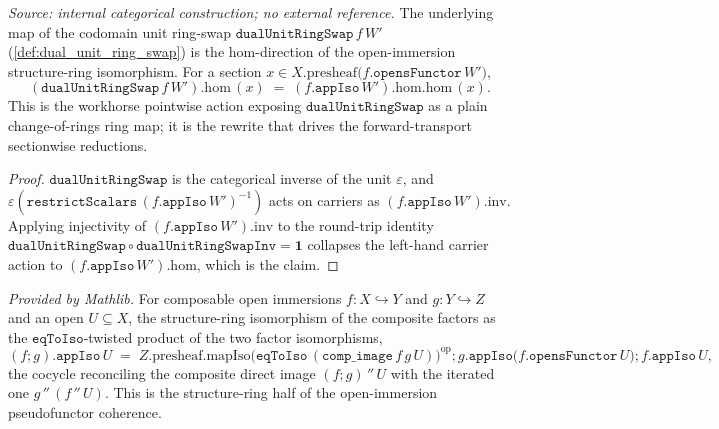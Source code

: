 \begin{lemma}
  \label{lem:dual_unit_ring_swap_apply}
  \textit{Source: internal categorical construction; no external reference.}
  The underlying map of the codomain unit ring-swap \(\mathtt{dualUnitRingSwap}\,f\,W'\)
  (\cref{def:dual_unit_ring_swap}) is the \(\mathrm{hom}\)-direction of the open-immersion structure-ring
  isomorphism. For a section \(x \in X.\mathrm{presheaf}\bigl(f.\mathtt{opensFunctor}\,W'\bigr)\),
  \[
    (\mathtt{dualUnitRingSwap}\,f\,W').\mathrm{hom}\,(x)
      \;=\; (f.\mathtt{appIso}\,W').\mathrm{hom}.\mathrm{hom}\,(x).
  \]
  This is the workhorse pointwise action exposing \(\mathtt{dualUnitRingSwap}\) as a plain
  change-of-rings ring map; it is the rewrite that drives the forward-transport sectionwise reductions.
\end{lemma}
\begin{proof}
  \leanok
  \(\mathtt{dualUnitRingSwap}\) is the categorical inverse of the unit \(\varepsilon\), and
  \(\varepsilon(\mathtt{restrictScalars}\,(f.\mathtt{appIso}\,W')^{-1})\) acts on carriers as
  \((f.\mathtt{appIso}\,W').\mathrm{inv}\). Applying injectivity of \((f.\mathtt{appIso}\,W').\mathrm{inv}\)
  to the round-trip identity \(\mathtt{dualUnitRingSwap} \circ \mathtt{dualUnitRingSwapInv} = \mathbf 1\)
  collapses the left-hand carrier action to \((f.\mathtt{appIso}\,W').\mathrm{hom}\), which is the claim.
\end{proof}

\begin{lemma}
  \label{lem:scheme_modules_comp_appiso}
  \mathlibok
  \textit{Provided by Mathlib.}
  For composable open immersions \(f : X \hookrightarrow Y\) and \(g : Y \hookrightarrow Z\) and an open
  \(U \subseteq X\), the structure-ring isomorphism of the composite factors as the
  \(\mathtt{eqToIso}\)-twisted product of the two factor isomorphisms,
  \[
    (f \mathbin{;} g).\mathtt{appIso}\,U
      \;=\; Z.\mathrm{presheaf}.\mathrm{mapIso}\bigl(\mathtt{eqToIso}\,
        (\mathtt{comp\_image}\,f\,g\,U)\bigr)^{\mathrm{op}}
        \mathbin{;} g.\mathtt{appIso}\bigl(f.\mathtt{opensFunctor}\,U\bigr) \mathbin{;} f.\mathtt{appIso}\,U,
  \]
  the cocycle reconciling the composite direct image \((f\mathbin{;}g)\,''\,U\) with the iterated one
  \(g\,''\,(f\,''\,U)\). This is the structure-ring half of the open-immersion pseudofunctor coherence.
\end{lemma}

